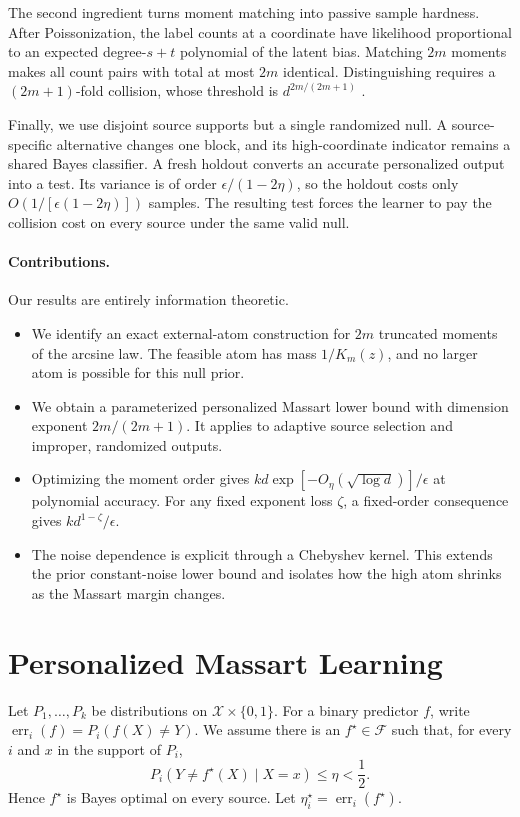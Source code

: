 \documentclass[twoside]{article}
\newcommand{\cF}{\mathcal F}
\newcommand{\cX}{\mathcal X}
\newcommand{\err}{\operatorname{err}}
\newcommand{\1}{\mathbf 1}
\begin{document}
The second ingredient turns moment matching into passive sample hardness. After Poissonization, the label counts at a coordinate have likelihood proportional to an expected degree-$s+t$ polynomial of the latent bias. Matching $2m$ moments makes all count pairs with total at most $2m$ identical. Distinguishing requires a $(2m+1)$-fold collision, whose threshold is $d^{2m/(2m+1)}$ \citep{wu2020polynomial,canonne2026short}.

Finally, we use disjoint source supports but a single randomized null. A source-specific alternative changes one block, and its high-coordinate indicator remains a shared Bayes classifier. A fresh holdout converts an accurate personalized output into a test. Its variance is of order $\epsilon/(1-2\eta)$, so the holdout costs only $O(1/[\epsilon(1-2\eta)])$ samples. The resulting test forces the learner to pay the collision cost on every source under the same valid null.

\paragraph{Contributions.}
Our results are entirely information theoretic.
\begin{itemize}
\item We identify an exact external-atom construction for $2m$ truncated
moments of the arcsine law. The feasible atom has mass $1/K_m(z)$, and no larger atom is possible for this null prior.
\item We obtain a parameterized personalized Massart lower bound with
dimension exponent $2m/(2m+1)$. It applies to adaptive source selection and improper, randomized outputs.
\item Optimizing the moment order gives
$kd\exp[-O_\eta(\sqrt{\log d})]/\epsilon$ at polynomial accuracy. For any fixed exponent loss $\zeta$, a fixed-order consequence gives $k d^{1-\zeta}/\epsilon$.
\item The noise dependence is explicit through a Chebyshev kernel. This
extends the prior constant-noise lower bound and isolates how the high atom shrinks as the Massart margin changes.
\end{itemize}

\section{Personalized Massart Learning}
\label{sec:setup}

Let $P_1,\ldots,P_k$ be distributions on $\cX\times\{0,1\}$. For a binary predictor $f$, write $\err_i(f)=P_i(f(X)\ne Y)$. We assume there is an $f^\star\in\cF$ such that, for every $i$ and $x$ in the support of $P_i$,
\begin{equation}
 P_i(Y\ne f^\star(X)\mid X=x)\le\eta<\frac12.
 \label{eq:massart}
\end{equation}
Hence $f^\star$ is Bayes optimal on every source. Let $\eta_i^\star=\err_i(f^\star)$.
\end{document}
